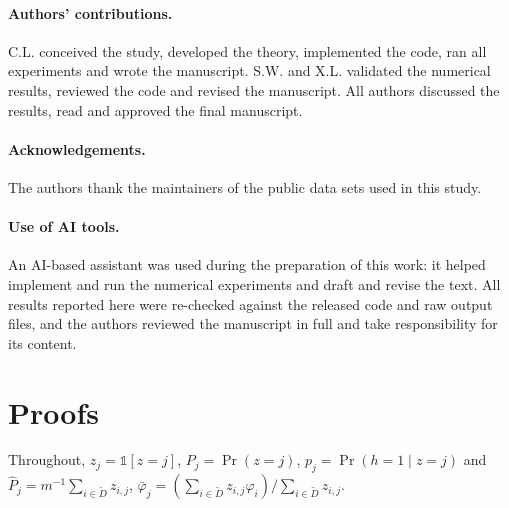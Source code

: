 \documentclass[11pt]{article}
\newcommand{\Dt}{\tilde D}
\begin{document}
\paragraph{Authors' contributions.} C.L. conceived the study, developed the theory, implemented
the code, ran all experiments and wrote the manuscript. S.W. and X.L. validated the numerical
results, reviewed the code and revised the manuscript. All authors discussed the results, read and
approved the final manuscript.

\paragraph{Acknowledgements.} The authors thank the maintainers of the public data sets used in
this study.

\paragraph{Use of AI tools.} An AI-based assistant was used during the preparation of this
work: it helped implement and run the numerical experiments and draft and revise the text.  All
results reported here were re-checked against the released code and raw output files, and the
authors reviewed the manuscript in full and take responsibility for its content.

\appendix
\section{Proofs}
\label{app:proofs}

Throughout, $z_j=\mathbb{1}[z=j]$, $P_j=\Pr(z=j)$, $p_j=\Pr(h=1\mid z=j)$ and
$\hat P_j=m^{-1}\sum_{i\in\Dt}z_{i,j}$, $\bar\varphi_j=(\sum_{i\in\Dt}z_{i,j}\varphi_i)/\sum_{i\in\Dt}z_{i,j}$.
\end{document}
